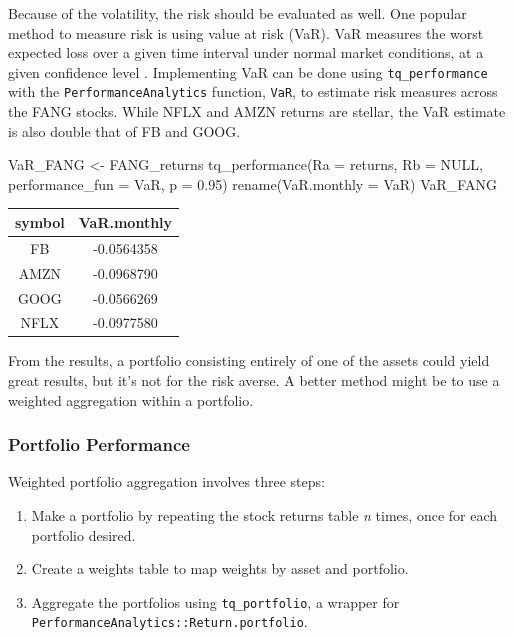 \hspace{20 mm}

Because of the volatility, the risk should be evaluated as well. One
popular method to measure risk is using value at risk (VaR). VaR
measures the worst expected loss over a given time interval under normal
market conditions, at a given confidence level \citep{Bacon2004}.
Implementing VaR can be done using \texttt{tq\_performance} with the
\texttt{PerformanceAnalytics} function, \texttt{VaR}, to estimate risk
measures across the FANG stocks. While NFLX and AMZN returns are
stellar, the VaR estimate is also double that of FB and GOOG.

\begin{Schunk}
\begin{Sinput}
VaR_FANG <- FANG_returns %
    tq_performance(Ra = returns, Rb = NULL, performance_fun = VaR, p = 0.95) %
    rename(VaR.monthly = VaR) 
VaR_FANG
\end{Sinput}
\end{Schunk}

\begin{tabular}{cc}
\toprule
symbol & VaR.monthly\\
\midrule
FB & -0.0564358\\
AMZN & -0.0968790\\
GOOG & -0.0566269\\
NFLX & -0.0977580\\
\bottomrule
\end{tabular}

\hspace{20 mm}

From the results, a portfolio consisting entirely of one of the assets
could yield great results, but it's not for the risk averse. A better
method might be to use a weighted aggregation within a portfolio.

\subsubsection{Portfolio Performance}\label{portfolio-performance}

Weighted portfolio aggregation involves three steps:

\begin{enumerate}
\def\labelenumi{\arabic{enumi}.}
\tightlist
\item
  Make a portfolio by repeating the stock returns table \emph{n} times,
  once for each portfolio desired.
\item
  Create a weights table to map weights by asset and portfolio.
\item
  Aggregate the portfolios using \texttt{tq\_portfolio}, a wrapper for
  \texttt{PerformanceAnalytics::Return.portfolio}.
\end{enumerate}

